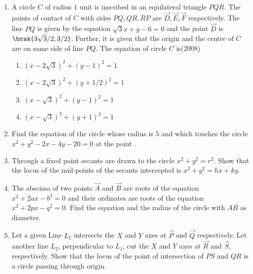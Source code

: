 \begin{enumerate}[label=\thesubsection.\arabic*.,ref=\thesubsection.\theenumi]
\begin{enumerate}
\item A line $L'$ through $\vec{A}$ is drawn parallel to $BD$. Point $S$ moves such that its distances from the line $BD$ and the vertex $\vec{A}$ are equal. If locus of $S$ cuts $L'$ at $T_2$ and $T_3$ and $AC$ at $T_1$, then area of $\Delta T_1T_2T_3$ is
%
\begin{multicols}{4}
\begin{enumerate}
\item $1/2$ sq.units
\item $2/3$ sq.units
\item $1$ sq.units
\item $2$ sq.units
\end{enumerate}
\end{multicols}
\end{enumerate}
%
\item A circle $C$ of radius $1$ unit is inscribed in an equilateral triangle $PQR$. The points of contact of $C$ with sides $PQ, QR, RP$ are $\vec{D}, \vec{E}, \vec{F}$ respectively. The line $PQ$ is given by the equation $\sqrt{3}x+y-6=0$ and the point $\vec{D}$ is $\brak{3\sqrt{3}/2,  3/2}$. Further, it is given that the origin and the centre of $C$ are on same side of line $PQ$.
%
The equation of circle $C$ is\hfill(2008)
\begin{multicols}{2}
\begin{enumerate}
\item $(x-2\sqrt{3})^2 + (y-1)^2=1$
\item $(x-2\sqrt{3})^2 + (y+1/2)^2=1$
\item $(x-\sqrt{3})^2 + (y-1)^2=1$
\item $(x-\sqrt{3})^2 + (y+1)^2=1$
\end{enumerate}
\end{multicols}
\item Find the equation of the circle whose radius is 5 and which touches the circle $x^2+y^2-2x-4y-20=0$ at the point .
%
\hfill {}
\item Through a fixed point  secants are drawn to the circle $x^2+y^2=r^2$. Show that the locus of the mid-points of the secants intercepted is $x^2+y^2=hx+ky$.
%
\hfill {}
\item The abscissa of two points $\vec{A}$ and $\vec{B}$ are roots of the equation $x^2+2ax-b^2=0$ and their ordinates are roots of the equation $x^2+2px-q^2=0$. Find the equation and the radius of the circle with $AB$ as diameter.
%
\hfill {}
\item Let a given Line $L_1$ intersects the $X$ and $Y$ axes at $\vec{P}$ and $\vec{Q}$ respectively. Let another line $L_2$,  perpendicular to $L_1$,  cut the $X$ and $Y$ axes at $\vec{R}$ and $\vec{S}$,  respectively. Show that the locus of the point of intersection of $PS$ and $QR$ is a circle passing through origin.

\end{enumerate}
